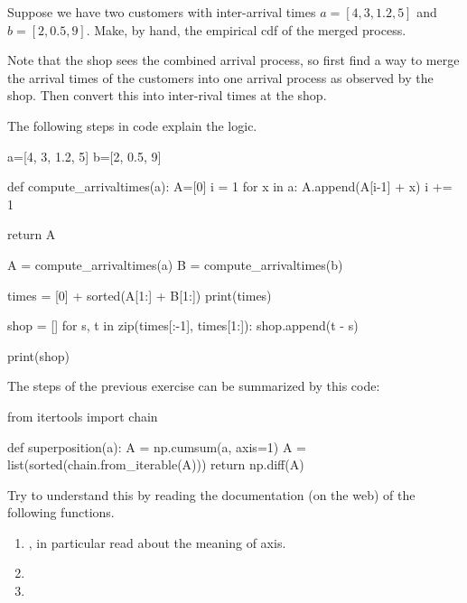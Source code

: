 \begin{exercise}


  Suppose we have two customers with inter-arrival times $a=[4, 3, 1.2, 5]$ and $b=[2, 0.5, 9]$. Make, by hand, the empirical cdf of the merged process.

  \begin{hint}
Note that the shop sees the combined arrival process, so first find a way to merge the arrival times of the customers into one arrival process as observed by the shop. Then convert this into inter-rival times at the shop.
  \end{hint}
  \begin{solution}
    The following steps in code explain the logic.
    \begin{pyblock}
a=[4, 3, 1.2, 5]
b=[2, 0.5, 9]

def compute_arrivaltimes(a):
    A=[0]
    i = 1
    for x in a:
        A.append(A[i-1] + x)
        i += 1

    return A

A = compute_arrivaltimes(a)
B = compute_arrivaltimes(b)


times = [0] + sorted(A[1:] + B[1:]) 
print(times)

shop = []
for s, t in zip(times[:-1], times[1:]):
    shop.append(t - s)

print(shop)
    \end{pyblock}
  \end{solution}
\end{exercise}


\begin{exercise}
  The steps of the previous exercise can be summarized by this code:
\begin{pyverbatim}
from itertools import chain

def superposition(a):
    A = np.cumsum(a, axis=1)
    A = list(sorted(chain.from_iterable(A)))
    return np.diff(A)

\end{pyverbatim}  

Try to understand this by reading the documentation (on the web) of the following functions.
\begin{enumerate}
\item {}, in particular read about the meaning of axis.
\item {}
\item {}
\end{enumerate}
\end{exercise}


